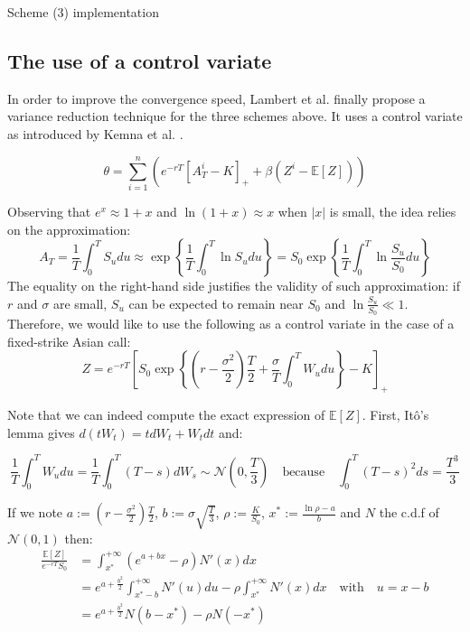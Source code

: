 \documentclass{article}
\begin{document}
\begin{algorithm}[hbt!]
\caption{Scheme (3) implementation}
\Return{$\dots$}\;
\end{algorithm}

\subsection{The use of a control variate}

In order to improve the convergence speed, Lambert et al. \cite{main} finally propose a variance reduction technique
for the three schemes above. It uses a control variate as introduced by Kemna et al. \cite{Vorst}.

\begin{equation}
	\theta = \sum_{i=1}^n \left( e^{-rT} \left[ A_T^i - K \right]_+ + \beta \left( Z^i - \mathbb E [Z] \right) \right)
	\tag{$\ast$}
\end{equation}

Observing that $e^x \approx 1 + x$ and $\ln(1 + x) \approx x$ when $| x |$ is small,
the idea relies on the approximation:
\[
	A_T = \frac{1}{T} \int_0^T S_u du \approx \exp \left\{ \frac{1}{T} \int_0^T \ln S_u du \right\}
	= S_0 \exp \left\{ \frac{1}{T} \int_0^T \ln \frac{S_u}{S_0} du \right\}
\]
The equality on the right-hand side justifies the validity of such approximation: if $r$ and $\sigma$ are small,
$S_u$ can be expected to remain near $S_0$ and $\ln \frac{S_u}{S_0} \ll 1$.
Therefore, we would like to use the following as a control variate in the case of a fixed-strike Asian call:
\[
	Z
	= e^{-rT} \left[ S_0 \exp \left\{ \left( r - \frac{\sigma^2}{2} \right) \frac{T}{2} +
		\frac{\sigma}{T} \int_0^T W_u du \right\}
		- K \right]_+
\]

Note that we can indeed compute the exact expression of $\mathbb E[Z]$. First, It\^o's lemma
gives $d(tW_t) = tdW_t + W_tdt$ and:

\[
	\frac{1}{T} \int_0^T W_u du = \frac{1}{T} \int_0^T (T-s) dW_s \sim \mathcal N \left(0, \frac{T}{3} \right)
	\quad \text{because} \quad \int_0^T (T-s)^2 ds = \frac{T^3}{3}
\]

If we note $a := \left( r - \frac{\sigma^2}{2} \right) \frac{T}{2}$, $b := \sigma \sqrt{\frac{T}{3}}$, $\rho :=\frac{K}{S_0}$,
$x^\ast := \frac{\ln \rho - a}{b}$ and $N$ the c.d.f of $\mathcal N (0, 1)$ then:
\begin{align*}
	\frac{\mathbb E[Z]}{e^{-rT} S_0}
	&= \int_{x^\ast}^{+ \infty} \left( e^{a + bx} - \rho \right) N'(x) dx \\
	&= e^{a + \frac{b^2}{2}} \int_{x^\ast - b}^{+ \infty} N'(u) du - \rho \int_{x^\ast}^{+ \infty} N'(x) dx
	\quad \text{with} \quad u = x - b \\
	&= e^{a + \frac{b^2}{2}} N(b - x^\ast) - \rho N(-x^\ast)
\end{align*}
	
\end{document}
